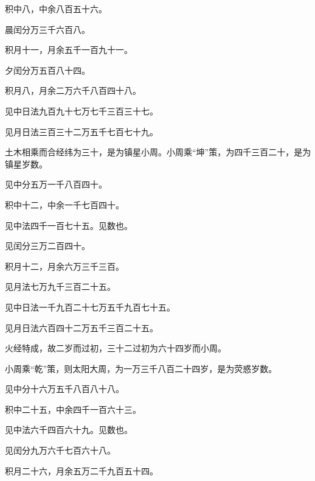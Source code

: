 \documentclass[12pt,UTF8]{ctexbook}
\begin{document}
积中八，中余八百五十六。



晨闰分万三千六百八。



积月十一，月余五千一百九十一。



夕闰分万五百八十四。



积月八，月余二万六千八百四十八。



见中日法九百九十七万七千三百三十七。



见月日法三百三十二万五千七百七十九。



土木相乘而合经纬为三十，是为镇星小周。小周乘“坤”策，为四千三百二十，是为镇星岁数。



见中分五万一千八百四十。



积中十二，中余一千七百四十。



见中法四千一百七十五。见数也。



见闰分三万二百四十。



积月十二，月余六万三千三百。



见月法七万九千三百二十五。



见中日法一千九百二十七万五千九百七十五。



见月日法六百四十二万五千三百二十五。



火经特成，故二岁而过初，三十二过初为六十四岁而小周。



小周乘“乾”策，则太阳大周，为一万三千八百二十四岁，是为荧惑岁数。



见中分十六万五千八百八十八。



积中二十五，中余四千一百六十三。



见中法六千四百六十九。见数也。



见闰分九万六千七百六十八。



积月二十六，月余五万二千九百五十四。
\end{document}
